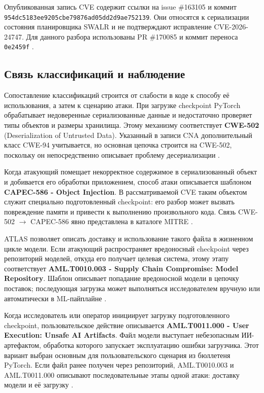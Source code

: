 \documentclass[12pt,a4paper]{report}
\begin{document}
Опубликованная запись CVE содержит ссылки на issue \#163105 и коммит \texttt{954dc5183ee9205cbe79876ad05dd2d9ae752139}. Они относятся к сериализации состояния планировщика SWALR и не подтверждают исправление CVE-2026-24747. Для данного разбора использованы PR \#170085 и коммит переноса \texttt{0e2459f} \cite{wrongcommit,fixpr}.

\subsection{Связь классификаций и наблюдение}

\begingroup
{}

Сопоставление классификаций строится от слабости в коде к способу её использования, а затем к сценарию атаки. При загрузке checkpoint PyTorch обрабатывает недоверенные сериализованные данные и недостаточно проверяет типы объектов и размеры хранилища. Этому механизму соответствует \textbf{CWE-502} (Deserialization of Untrusted Data). Указанный в записи CNA дополнительный класс CWE-94 учитывается, но основная цепочка строится на CWE-502, поскольку он непосредственно описывает проблему десериализации \cite{cwe502,fixpr}.

Когда атакующий помещает некорректное содержимое в сериализованный объект и добивается его обработки приложением, способ атаки описывается шаблоном \textbf{\mbox{CAPEC-586} - Object Injection}. В рассматриваемой CVE таким объектом служит специально подготовленный checkpoint: его разбор может вызвать повреждение памяти и привести к выполнению произвольного кода. Связь CWE-502 $\rightarrow$ CAPEC-586 явно представлена в каталоге MITRE \cite{capec586,ghsa}.

ATLAS позволяет описать доставку и использование такого файла в жизненном цикле модели. Если атакующий распространяет вредоносный checkpoint через репозиторий моделей, откуда его получает целевая система, этому этапу соответствует \textbf{AML.T0010.003 - Supply Chain Compromise: Model Repository}. Шаблон описывает попадание вредоносной модели в цепочку поставок; последующая загрузка может выполняться исследователем вручную или автоматически в ML-пайплайне \cite{atlas202610}.

Когда исследователь или оператор инициирует загрузку подготовленного checkpoint, пользовательское действие описывается \textbf{AML.T0011.000 - User Execution: Unsafe AI Artifacts}. Файл модели выступает небезопасным ИИ-артефактом, обработка которого запускает эксплуатацию ошибки загрузчика. Этот вариант выбран основным для пользовательского сценария из бюллетеня PyTorch. Если файл ранее получен через репозиторий, AML.T0010.003 и AML.T0011.000 описывают последовательные этапы одной атаки: доставку модели и её загрузку \cite{atlas202610,ghsa}.
\end{document}
